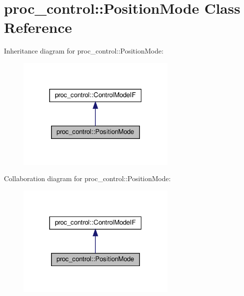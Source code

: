 \hypertarget{classproc__control_1_1_position_mode}{}\section{proc\+\_\+control\+:\+:Position\+Mode Class Reference}
\label{classproc__control_1_1_position_mode}


Inheritance diagram for proc\+\_\+control\+:\+:Position\+Mode\+:\nopagebreak
\begin{figure}[H]
\begin{center}
\leavevmode
\includegraphics[width=220pt]{classproc__control_1_1_position_mode__inherit__graph}
\end{center}
\end{figure}


Collaboration diagram for proc\+\_\+control\+:\+:Position\+Mode\+:\nopagebreak
\begin{figure}[H]
\begin{center}
\leavevmode
\includegraphics[width=220pt]{classproc__control_1_1_position_mode__coll__graph}
\end{center}
\end{figure}
